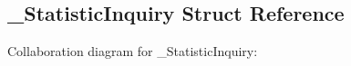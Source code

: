 \hypertarget{a00001}{}\subsection{\+\_\+\+Statistic\+Inquiry Struct Reference}
\label{a00001}


Collaboration diagram for \+\_\+\+Statistic\+Inquiry\+:

